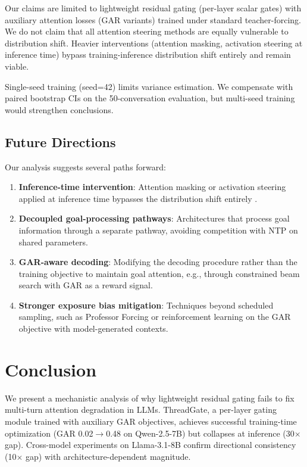 \documentclass[11pt]{article}
\begin{document}
Our claims are limited to lightweight residual gating (per-layer scalar gates) with auxiliary attention losses (GAR variants) trained under standard teacher-forcing.
We do not claim that all attention steering methods are equally vulnerable to distribution shift.
Heavier interventions (attention masking, activation steering at inference time) bypass training-inference distribution shift entirely and remain viable.

Single-seed training (seed=42) limits variance estimation.
We compensate with paired bootstrap CIs on the 50-conversation evaluation, but multi-seed training would strengthen conclusions.

\subsection{Future Directions}

Our analysis suggests several paths forward:
\begin{enumerate}
\item \textbf{Inference-time intervention}: Attention masking or activation steering applied at inference time bypasses the distribution shift entirely \cite{li2024inference}.
\item \textbf{Decoupled goal-processing pathways}: Architectures that process goal information through a separate pathway, avoiding competition with NTP on shared parameters.
\item \textbf{GAR-aware decoding}: Modifying the decoding procedure rather than the training objective to maintain goal attention, e.g., through constrained beam search with GAR as a reward signal.
\item \textbf{Stronger exposure bias mitigation}: Techniques beyond scheduled sampling, such as Professor Forcing \cite{lamb2016professor} or reinforcement learning on the GAR objective with model-generated contexts.
\end{enumerate}

\section{Conclusion}

We present a mechanistic analysis of why lightweight residual gating fails to fix multi-turn attention degradation in LLMs.
ThreadGate, a per-layer gating module trained with auxiliary GAR objectives, achieves successful training-time optimization (GAR 0.02$\to$0.48 on Qwen-2.5-7B) but collapses at inference (30$\times$ gap).
Cross-model experiments on Llama-3.1-8B confirm directional consistency (10$\times$ gap) with architecture-dependent magnitude.
\end{document}
